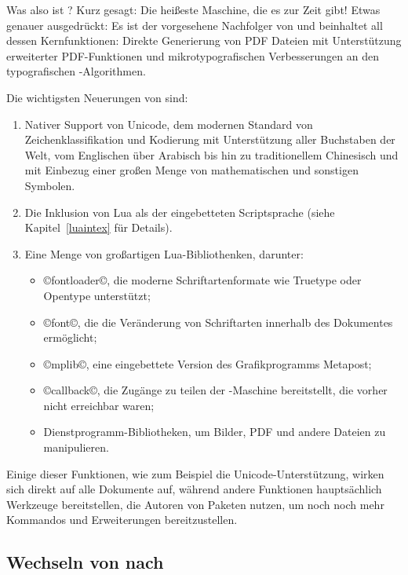 \documentclass{lltxdoc}
\begin{document}
Was also ist \luatex? Kurz gesagt: Die heißeste \tex Maschine, die es zur Zeit
gibt! Etwas genauer ausgedrückt: Es ist der vorgesehene Nachfolger von \pdftex 
und beinhaltet all dessen Kernfunktionen: Direkte Generierung von PDF Dateien 
mit Unterstützung erweiterter PDF-Funktionen und mikrotypografischen 
Verbesserungen an den typografischen \tex-Algorithmen.

Die wichtigsten Neuerungen von \luatex sind:

\begin{enumerate}
  \item Nativer Support von Unicode, dem modernen Standard von Zeichenklassifikation
        und Kodierung mit Unterstützung aller Buchstaben der Welt, vom 
        Englischen über Arabisch bis hin zu traditionellem Chinesisch und mit 
        Einbezug einer großen Menge von mathematischen und sonstigen Symbolen.
  \item Die Inklusion von Lua als der eingebetteten Scriptsprache (siehe 
        Kapitel~\ref{luaintex} für Details).
  \item Eine Menge von großartigen Lua-Bibliothenken, darunter:
    \begin{itemize}
      \item ©fontloader©, die moderne Schriftartenformate wie Truetype oder
            Opentype unterstützt;
      \item ©font©, die die Veränderung von Schriftarten innerhalb des Dokumentes
            ermöglicht;
      \item ©mplib©, eine eingebettete Version des Grafikprogramms Metapost;
      \item ©callback©, die Zugänge zu teilen der \tex-Maschine bereitstellt,
            die vorher nicht erreichbar waren;
      \item Dienstprogramm-Bibliotheken, um Bilder, PDF und andere Dateien zu
            manipulieren.
    \end{itemize}
\end{enumerate}

Einige dieser Funktionen, wie zum Beispiel die Unicode-Unterstützung, wirken sich
direkt auf alle Dokumente auf, während andere Funktionen hauptsächlich Werkzeuge 
bereitstellen, die Autoren von Paketen nutzen, um noch noch mehr Kommandos und 
Erweiterungen bereitzustellen.

\subsection{Wechseln von \latex nach \lualatex}\label{switch}
\end{document}
